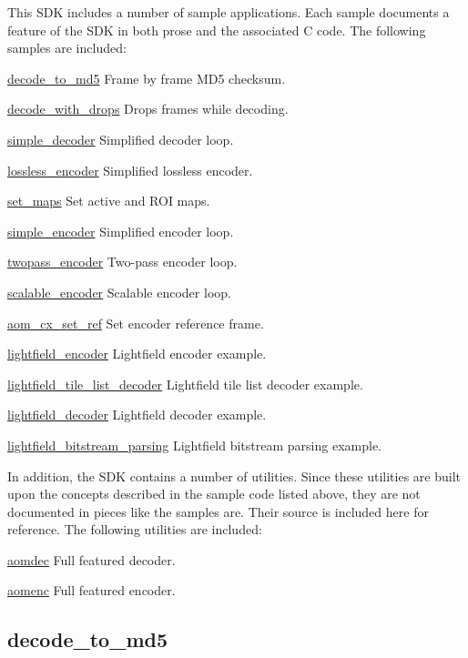 This S\+DK includes a number of sample applications. Each sample documents a feature of the S\+DK in both prose and the associated C code. The following samples are included\+:


\begin{DoxyItemize}
\item \hyperlink{example_decode_to_md5}{decode\+\_\+to\+\_\+md5} Frame by frame M\+D5 checksum.
\item \hyperlink{example_decode_with_drops}{decode\+\_\+with\+\_\+drops} Drops frames while decoding.
\item \hyperlink{example_simple_decoder}{simple\+\_\+decoder} Simplified decoder loop.
\item \hyperlink{example_lossless_encoder}{lossless\+\_\+encoder} Simplified lossless encoder.
\item \hyperlink{example_set_maps}{set\+\_\+maps} Set active and R\+OI maps.
\item \hyperlink{example_simple_encoder}{simple\+\_\+encoder} Simplified encoder loop.
\item \hyperlink{example_twopass_encoder}{twopass\+\_\+encoder} Two-\/pass encoder loop.
\item \hyperlink{example_scalable_encoder}{scalable\+\_\+encoder} Scalable encoder loop.
\item \hyperlink{example_aom_cx_set_ref}{aom\+\_\+cx\+\_\+set\+\_\+ref} Set encoder reference frame.
\item \hyperlink{example_lightfield_encoder}{lightfield\+\_\+encoder} Lightfield encoder example.
\item \hyperlink{example_lightfield_tile_list_decoder}{lightfield\+\_\+tile\+\_\+list\+\_\+decoder} Lightfield tile list decoder example.
\item \hyperlink{example_lightfield_decoder}{lightfield\+\_\+decoder} Lightfield decoder example.
\item \hyperlink{example_lightfield_bitstream_parsing}{lightfield\+\_\+bitstream\+\_\+parsing} Lightfield bitstream parsing example.
\end{DoxyItemize}

In addition, the S\+DK contains a number of utilities. Since these utilities are built upon the concepts described in the sample code listed above, they are not documented in pieces like the samples are. Their source is included here for reference. The following utilities are included\+:


\begin{DoxyItemize}
\item \hyperlink{example_aomdec}{aomdec} Full featured decoder.
\item \hyperlink{example_aomenc}{aomenc} Full featured encoder. 
\end{DoxyItemize}\hypertarget{example_decode_to_md5}{}\subsection{decode\+\_\+to\+\_\+md5}\label{example_decode_to_md5}

